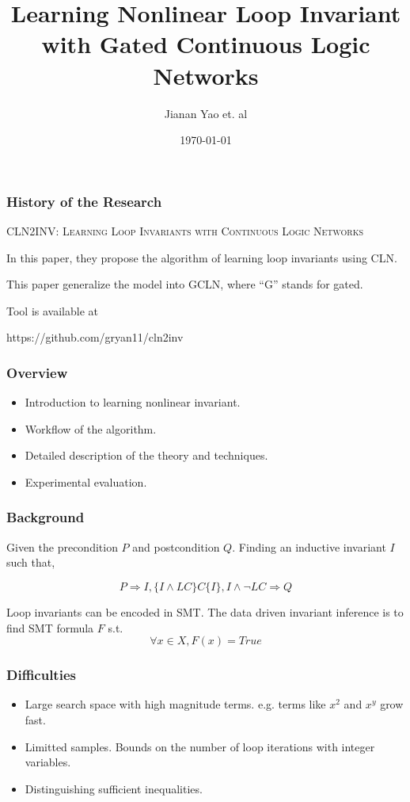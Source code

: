 \documentclass[11pt]{beamer}
\title{Learning Nonlinear Loop Invariant with Gated Continuous Logic Networks}
\date{\today}
\author{Jianan Yao et. al}
\begin{document}
\maketitle

\begin{frame}\frametitle{History of the Research}

\begin{center}
\textsc{CLN2INV: Learning Loop Invariants with Continuous Logic Networks}
\end{center}

In this paper, they propose the algorithm of learning loop invariants using CLN.

This paper generalize the model into GCLN, where ``G'' stands for gated.


Tool is available at

https://github.com/gryan11/cln2inv
\end{frame}
\begin{frame}\frametitle{Overview}
\begin{itemize}
\item Introduction to learning nonlinear invariant.
\item Workflow of the algorithm.
\item Detailed description of the theory and techniques.
\item Experimental evaluation.
\end{itemize}

\end{frame}

\begin{frame}\frametitle{Background}
\begin{definition}
Given the precondition $P$ and postcondition $Q$. Finding an inductive invariant $I$ such that,

\[P\Longrightarrow I, \{I\wedge LC\}C\{I\}, I\wedge \neg LC \Longrightarrow Q\]

\end{definition}
Loop invariants can be encoded in SMT. The data driven invariant inference is to find SMT formula $F$ s.t.
\[\forall x\in X, F(x) = True\]


\end{frame}
\begin{frame}\frametitle{Difficulties}
\begin{itemize}
\item Large search space with high magnitude terms. e.g. terms like $x^2$ and $x^y$ grow fast.

\item Limitted samples. Bounds on the number of loop iterations with integer variables.

\item Distinguishing sufficient inequalities.

\end{itemize}

\end{frame}
\end{document}
